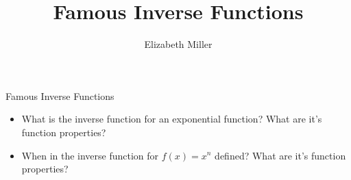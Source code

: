 \documentclass{ximera}
\author{Elizabeth Miller}
\title{Famous Inverse Functions}
\begin{document}
\begin{abstract}
\end{abstract}
\maketitle


\begin{objectives}

\item Famous Inverse Functions
\begin{itemize}
	\item What is the inverse function for an exponential function?  What are it's function properties?
	\item When in the inverse function for $f(x)=x^n$ defined?  What are it's function properties?
\end{itemize}




\end{objectives}
\end{document}
